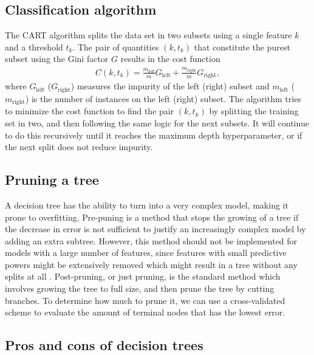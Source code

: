 \subsection{Classification algorithm}
The CART algorithm splits the data set in two subsets using a single feature $k$ and a threshold $t_k$. The pair of quantities $(k,t_k)$ that constitute the purest subset using the Gini factor $G$ results in the cost function
\begin{align}
  C(k, t_k) = \frac{m_{\text{left}}}{m}G_{\text{left}} + \frac{m_{\text{right}}}{m}G_{\text{right}},
\end{align}
where $G_{\text{left}}$ ($G_{\text{right}}$) measures the impurity of the left (right) subset and $m_{\text{left}}$  ($m_{\text{right}}$) is the number of instances on the left (right) subset. The algorithm tries to minimize the cost function to find the pair $(k,t_k)$ by splitting the training set in two, and then following the same logic for the next subsets. It will continue to do this recursively until it reaches the maximum depth hyperparameter, or if the next split does not reduce impurity.

\subsection{Pruning a tree}

A decision tree has the ability to turn into a very complex model, making it prone to overfitting. Pre-puning is a method that stops the growing of a tree if the decrease in error is not sufficient to justify an increasingly complex model by adding an extra subtree. However, this method should not be implemented for models with a large number of features, since features with small predictive powers might be extensively removed which might result in a tree without any splits at all \cite{Murphy2012}. Post-pruning, or just pruning, is the standard method which involves growing the tree to full size, and then prune the tree by cutting branches. To determine how much to prune it, we can use a cross-validated scheme to evaluate the amount of terminal nodes that has the lowest error.


\subsection{Pros and cons of decision trees}

